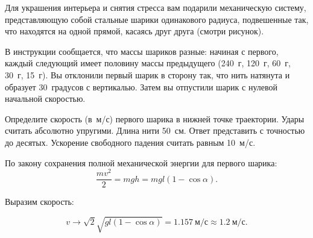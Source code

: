 
Для украшения интерьера и снятия стресса вам подарили механическую систему, 
представляющую собой стальные шарики одинакового радиуса, подвешенные так, что 
находятся на одной прямой, касаясь друг друга (смотри рисунок).


В инструкции сообщается, что массы шариков разные: начиная с первого, каждый следующий имеет 
половину массы предыдущего (240~г, 120~г, 60~г, 30~г, 15~г). Вы отклонили первый шарик в сторону так, 
что нить натянута и образует 30~градусов с вертикалью. Затем вы отпустили шарик с 
нулевой начальной скоростью.

Определите скорость (в~м/с) первого шарика в нижней точке траектории. Удары считать абсолютно упругими. 
Длина нити 50~см. Ответ представить с точностью до десятых. Ускорение свободного падения считать равным 10~м/с.

\solutionSection

По закону сохранения полной механической энергии для первого шарика:
$$\frac{mv^2}{2} = mgh = mgl (1 - \cos \alpha).$$

Выразим скорость:

$$v \rightarrow \sqrt{2} \sqrt{g l (1 - \cos \alpha)} = 1.157 \: \text{м/с} \approx 1.2 \: \text{м/с}.$$

